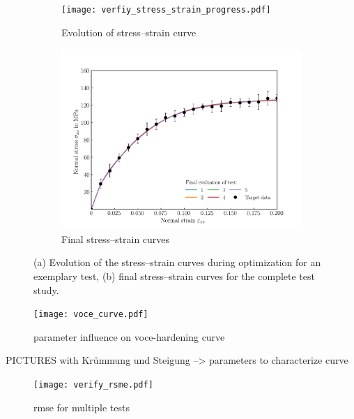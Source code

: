\begin{figure}[H]
    \centering

    \begin{subfigure}[t]{0.47\textwidth}
        \centering
        \texttt{[image: verfiy\_stress\_strain\_progress.pdf]}
        \caption{Evolution of stress–strain curve}
        \label{fig:progress_stress_strain_curve}
    \end{subfigure}
    \hfill
    \begin{subfigure}[t]{0.47\textwidth}
        \centering
        \includegraphics[width=\textwidth]{verify_stress_strain_combined.pdf}
        \caption{Final stress–strain curves}
        \label{fig:final_stress_strain_curves}
    \end{subfigure}

    \caption{%
        (a) Evolution of the stress–strain curves during optimization for an exemplary test,
        (b) final stress–strain curves for the complete test study.%
    }
    \label{fig:complete}
\end{figure}

   
   \begin{figure}[H]
		\centering
        \texttt{[image: voce\_curve.pdf]}
		\caption{parameter influence on voce-hardening curve}
		\label{fig:Parameter influence on VOCE-hardening curve}
	\end{figure}
    PICTURES with Krümmung und Steigung --> parameters to characterize curve

    \begin{figure}[H]
		\centering
        \texttt{[image: verify\_rsme.pdf]}
		\caption{rmse for multiple tests}
		\label{fig:rmse progress}
	\end{figure}


